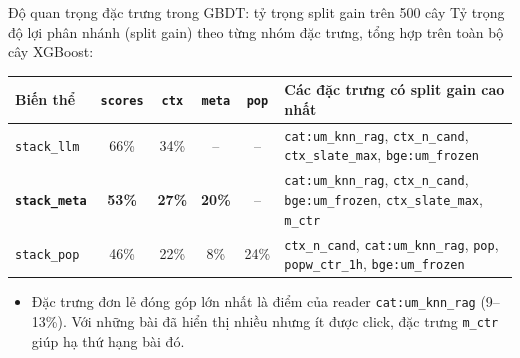 \documentclass[aspectratio=169,t]{beamer}
\newcommand{\code}[1]{\texttt{#1}}
\begin{document}
\begin{frame}[shrink]{Độ quan trọng đặc trưng trong GBDT: tỷ trọng split gain trên 500 cây}
\scriptsize
Tỷ trọng độ lợi phân nhánh (split gain) theo từng nhóm đặc trưng, tổng hợp trên toàn bộ cây XGBoost:\par\vspace{2pt}
\renewcommand{\arraystretch}{1.15}
\begin{tabularx}{\textwidth}{@{}lccccY@{}}
\toprule
\textbf{Biến thể} & \textbf{\code{scores}} & \textbf{\code{ctx}} & \textbf{\code{meta}} & \textbf{\code{pop}} & \textbf{Các đặc trưng có split gain cao nhất}\\
\midrule
\code{stack\_llm} & 66\% & 34\% & -- & -- & \code{cat:um\_knn\_rag}, \code{ctx\_n\_cand}, \code{ctx\_slate\_max}, \code{bge:um\_frozen}\\
\textbf{\code{stack\_meta}} & \textbf{53\%} & \textbf{27\%} & \textbf{20\%} & -- & \code{cat:um\_knn\_rag}, \code{ctx\_n\_cand}, \code{bge:um\_frozen}, \code{ctx\_slate\_max}, \code{m\_ctr}\\
\code{stack\_pop} & 46\% & 22\% & 8\% & 24\% & \code{ctx\_n\_cand}, \code{cat:um\_knn\_rag}, \code{pop}, \code{popw\_ctr\_1h}, \code{bge:um\_frozen}\\
\bottomrule
\end{tabularx}
\par\vspace{6pt}
\centering
{}
\par\vspace{2pt}
\raggedright
\begin{itemize}
  \setlength{\itemsep}{1pt}
  \item Đặc trưng đơn lẻ đóng góp lớn nhất là điểm của reader \code{cat:um\_knn\_rag} (9--13\%). Với những bài đã hiển thị nhiều nhưng ít được click, đặc trưng \code{m\_ctr} giúp hạ thứ hạng bài đó.

\end{itemize}
\end{frame}
\end{document}
